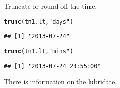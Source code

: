 \documentclass[12pt, a4paper, oneside]{article}\usepackage[]{graphicx}\usepackage[]{color}
\makeatletter
\newcommand{\hlstr}[1]{\textcolor[rgb]{0.192,0.494,0.8}{#1}}%
\newcommand{\hlkwd}[1]{\textcolor[rgb]{0.737,0.353,0.396}{\textbf{#1}}}%
\newenvironment{kframe}{%
 \def\at@end@of@kframe{}%
 \ifinner\ifhmode%
  \def\at@end@of@kframe{\end{minipage}}%
  \begin{minipage}{\columnwidth}%
 \fi\fi%
 \def\FrameCommand##1{\hskip\@totalleftmargin \hskip-\fboxsep
 \colorbox{shadecolor}{##1}\hskip-\fboxsep
     \hskip-\linewidth \hskip-\@totalleftmargin \hskip\columnwidth}%
 \MakeFramed {\advance\hsize-\width
   \@totalleftmargin\z@ \linewidth\hsize
   \@setminipage}}%
 {\par\unskip\endMakeFramed%
 \at@end@of@kframe}
\newenvironment{knitrout}{}{} %
\makeatother
\begin{document}
Truncate or round off the time. 
\begin{knitrout}
\color{fgcolor}\begin{kframe}
\begin{alltt}
\hlkwd{trunc}(tm1.lt, \hlstr{"days"})
\end{alltt}
\begin{verbatim}
## [1] "2013-07-24"
\end{verbatim}
\begin{alltt}
\hlkwd{trunc}(tm1.lt, \hlstr{"mins"})
\end{alltt}
\begin{verbatim}
## [1] "2013-07-24 23:55:00"
\end{verbatim}
\end{kframe}
\end{knitrout}

There is information on the lubridate. 
\end{document}
